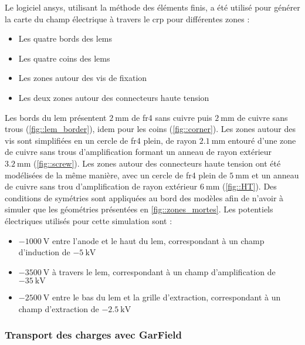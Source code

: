                 Le logiciel \gls{ansys}, utilisant la méthode des éléments finis, a été utilisé pour générer la carte du champ électrique à travers le \gls{crp} pour différentes zones : 
                \begin{itemize}
                    \item Les quatre bords des \glspl{lem}
                    \item Les quatre coins des \glspl{lem}
                    \item Les zones autour des vis de fixation
                    \item Les deux zones autour des connecteurs haute tension
                \end{itemize}
                Les bords du \gls{lem} présentent $\SI{2}{\milli\meter}$ de \gls{fr4} sans cuivre puis $\SI{2}{\milli\meter}$ de cuivre sans trous (\autoref{fig::lem_border}), idem pour les coins (\autoref{fig::corner}). Les zones autour des vis sont simplifiées en un cercle de \gls{fr4} plein, de rayon $\SI{2.1}{\milli\meter}$ entouré d'une zone de cuivre sans trous d'amplification formant un anneau de rayon extérieur $\SI{3.2}{\milli\meter}$ (\autoref{fig::screw}). Les zones autour des connecteurs haute tension ont été modélisées de la même manière, avec un cercle de \gls{fr4} plein de $\SI{5}{\milli\meter}$ et un anneau de cuivre sans trou d'amplification de rayon extérieur $\SI{6}{\milli\meter}$ (\autoref{fig::HT}). Des conditions de symétries sont appliquées au bord des modèles afin de n'avoir à simuler que les géométries présentées en \autoref{fig::zones_mortes}. 
                Les potentiels électriques utilisés pour cette simulation sont : 
                \begin{itemize}
                    \item $\SI{-1000}{\volt}$ entre l'anode et le haut du \gls{lem}, correspondant à un champ d'induction de $\SI{-5}{\kilo\volt}$
                    \item $\SI{-3500}{\volt}$ à travers le \gls{lem}, correspondant à un champ d'amplification de $\SI{-35}{\kilo\volt}$
                    \item $\SI{-2500}{\volt}$ entre le bas du \gls{lem} et la grille d'extraction, correspondant à un champ d'extraction de $\SI{-2.5}{\kilo\volt}$
                \end{itemize}
                
            \subsubsection{Transport des charges avec GarField}
                
